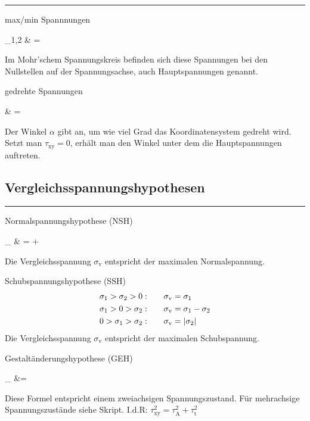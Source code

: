 \hrule
\begin{eeqn}{max/min Spannnungen}
	\begin{flalign}
		\sigma_{1,2} & =  \pm {}  
	\end{flalign}
	Im Mohr'schem Spannungskreis befinden sich diese Spannungen bei den Nullstellen auf der Spannungsachse, auch Hauptspannungen genannt.
\end{eeqn}

\begin{eeqn}{gedrehte Spannungen}
	\begin{flalign}
		\alpha & = \frac{2\tau_\text{xy}}{\sigma_\text{x}-\sigma_\text{y}}
	\end{flalign}
	Der Winkel $\alpha$ gibt an, um wie viel Grad das Koordinatensystem gedreht wird. Setzt man $\tau_\text{xy} = 0$, erhält man den Winkel unter dem die Hauptspannungen auftreten. 
\end{eeqn}

\subsection{Vergleichs\-spannungs\-hypothesen}
\hrule
\begin{eeqn}{Normalspannungs\-hypothese (NSH)}
	\begin{flalign}
		\sigma_ & =  +  \sqrt{(\sigma_\text{x}-\sigma_\text{y})^2+4\tau_\text{xy}^2}
	\end{flalign}
	Die Vergleichsspannung $\sigma_\text{v}$ entspricht der maximalen Normalspannung.
\end{eeqn}

\begin{eeqn}{Schubspannungs\-hypothese (SSH)}
	\begin{align}
		&\sigma_1 > \sigma_2 > 0: &\quad \sigma_\text{v} &= \sigma_1 \\
		& \sigma_1 > 0 > \sigma_2: &\quad  \sigma_\text{v}& = \sigma_1 - \sigma_2 \\
		& 0 > \sigma_1 > \sigma_2: &\quad \sigma_\text{v} &= \left| \sigma_2 \right|
	\end{align}
	Die Vergleichsspannung $\sigma_\text{v}$ entspricht der maximalen Schubspannung.
\end{eeqn}

\begin{eeqn}{Gestaltänderungs\-hypothese (GEH)}
	\begin{flalign}
		\sigma_ &= \sqrt{\sigma_{x}^2+\sigma_{y}^2-\sigma_{x}\sigma_{y}+3\tau_\text{xy}^2}
	\end{flalign}
	Diese Formel entspricht einem zweiachsigen Spannungszustand. Für mehrachsige Spannungszustände siehe Skript. I.d.R: $\tau_\text{xy}^2 = \tau_\text{A}^2+ \tau_\text{t}^2$
\end{eeqn}
\vfill
\pagebreak


